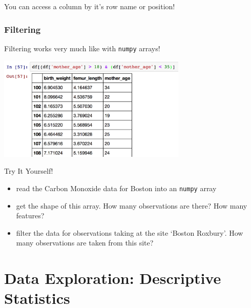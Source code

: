 \documentclass[12pt,t]{beamer}
\begin{document}
\begin{frame}[fragile]
\begin{itemize}
{\begin{center}
\end{center}
You can access a column by it's row name or position!
}
\end{itemize}
\end{frame}

\begin{frame}[fragile]
  \frametitle{Filtering}
Filtering works very much like with \texttt{numpy} arrays!
\begin{center}
\includegraphics[width=90mm]{filtering}
\end{center}
\end{frame}

\begin{frame}{Try It Yourself!}
\begin{itemize}
\item read the Carbon Monoxide data for Boston into an \texttt{numpy} array
\item get the shape of this array. How many observations are there? How many features?
\item filter the data for observations taking at the site `Boston Roxbury'. How many observations are taken from this site?
\end{itemize}
\end{frame}


\section{Data Exploration: Descriptive Statistics}
\end{document}
